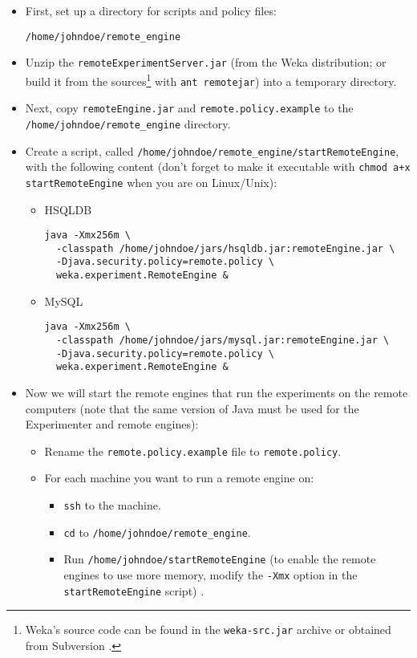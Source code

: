 \begin{itemize}
   \item First, set up a directory for scripts and policy files: 
		\begin{verbatim}
/home/johndoe/remote_engine
		\end{verbatim}

   \item Unzip the \texttt{remoteExperimentServer.jar} (from the Weka distribution; or build it from the sources\footnote{Weka's source code can be found in the \texttt{weka-src.jar} archive or obtained from Subversion \cite{subversion}.} with \texttt{ant remotejar}) into a temporary directory.

   \item Next, copy \texttt{remoteEngine.jar} and \texttt{remote.policy.example} to the \\ \texttt{/home/johndoe/remote\_engine} directory.

   \item Create a script, called \texttt{/home/johndoe/remote\_engine/startRemoteEngine}, with the following content (don't forget to make it executable with \texttt{chmod a+x startRemoteEngine} when you are on Linux/Unix): 
      \begin{itemize}
      	\item HSQLDB
				\begin{verbatim}
java -Xmx256m \
  -classpath /home/johndoe/jars/hsqldb.jar:remoteEngine.jar \
  -Djava.security.policy=remote.policy \
  weka.experiment.RemoteEngine &
				\end{verbatim}
			
			\item MySQL
				\begin{verbatim}
java -Xmx256m \
  -classpath /home/johndoe/jars/mysql.jar:remoteEngine.jar \
  -Djava.security.policy=remote.policy \
  weka.experiment.RemoteEngine &
				\end{verbatim}
		\end{itemize}

   \item Now we will start the remote engines that run the experiments on the remote computers (note that the same version of Java must be used for the Experimenter and remote engines):
   	\begin{itemize}
         \item Rename the \texttt{remote.policy.example} file to \texttt{remote.policy}.

         \item For each machine you want to run a remote engine on:
         	\begin{itemize}
         		\item \texttt{ssh} to the machine.
               \item \texttt{cd} to \texttt{/home/johndoe/remote\_engine}.
               \item Run \texttt{/home/johndoe/startRemoteEngine} (to enable the remote engines to use more memory, modify the \texttt{-Xmx} option in the \texttt{startRemoteEngine} script) .
            \end{itemize}
      \end{itemize}
\end{itemize}



